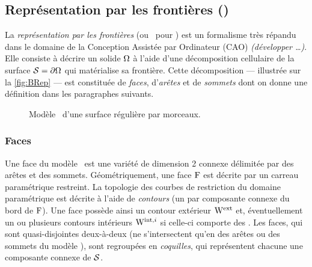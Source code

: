 \subsection{Représentation par les frontières (\brep)}
La \textit{représentation par les frontières} (ou \brep\ pour ) est un formalisme très répandu dans le domaine de la Conception Assistée par Ordinateur (CAO) \textit{(développer \ldots)}.
Elle consiste à décrire un solide $\Omega$ à l'aide d'une décomposition cellulaire de la surface $\mathcal{S} = \partial \Omega$ qui matérialise sa frontière. 
Cette décomposition --- illustrée sur la \autoref{fig:BRep} --- est constituée de \textit{faces}, d'\textit{arêtes} et de \textit{sommets} dont on donne une définition dans les paragraphes suivants. 

\begin{figure}
	\centering
	
	\caption{Modèle \brep\ d'une surface régulière par morceaux.}
	\label{fig:BRep}
\end{figure}

\subsubsection{Faces}
\label{section:def_brep_faces}
Une face du modèle \brep\ est une variété de dimension 2 connexe délimitée par des arêtes et des sommets. 
Géométriquement, une face $\mathrm{F}$ est décrite par un carreau paramétrique restreint.
La topologie des courbes de restriction du domaine paramétrique est décrite à l'aide de \textit{contours} (un par composante connexe du bord de $\mathrm{F}$). 
Une face possède ainsi un contour extérieur $\mathrm{W}^{\mathrm{ext}}$ et, éventuellement un ou plusieurs contours intérieurs $\mathrm{W}^{\mathrm{int},i}$ si celle-ci comporte des .
Les faces, qui sont quasi-disjointes deux-à-deux (\ie ne s'intersectent qu'en des arêtes ou des sommets du modèle \brep), sont regroupées en \textit{coquilles}, qui représentent chacune une composante connexe de $\mathcal{S}$. 


